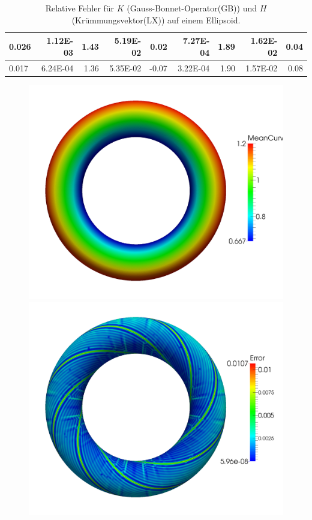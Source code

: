 \begin{table}[htbp]
\begin{tabular}{|l|r|r|r|r|r|r|r|r|}
            0.026 & 1.12E-03 & 1.43 & 5.19E-02 & 0.02 & 7.27E-04 & 1.89 & 1.62E-02 & 0.04 \\ \hline
            0.017 & 6.24E-04 & 1.36 & 5.35E-02 & -0.07 & 3.22E-04 & 1.90 & 1.57E-02 & 0.08 \\ \hline
      \end{tabular}
      \caption[Gauß-Bonnet und Krümmungsvektor auf einem Ellipsoid]{Relative Fehler für \( K \) (Gauss-Bonnet-Operator(GB)) und \( H \)
      (Krümmungsvektor(LX)) auf einem Ellipsoid.}
      \label{tabHeineCGBLX}
   \end{table}
  

  \begin{figure}
    \begin{minipage}[t]{0.49\textwidth}
          \centering\includegraphics[width=\textwidth]{bilder/Curvature/WeinMeanTorus_25k.png}
        \end{minipage} \hfill
        \begin{minipage}[t]{0.49\textwidth}
          \centering\includegraphics[width=\textwidth]{bilder/Curvature/WeinMeanTorusError_25k.png}

\end{minipage}
\end{figure}

